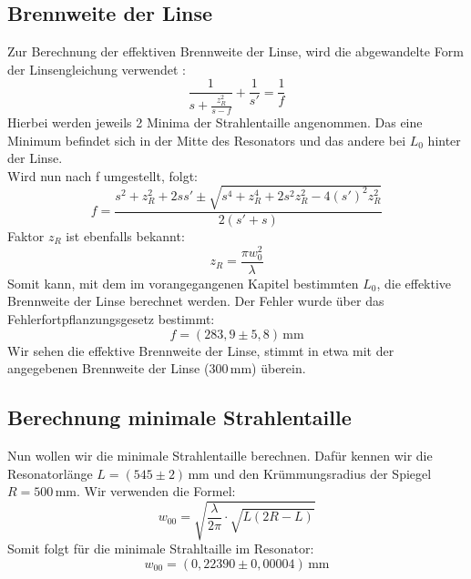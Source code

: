 \subsection{Brennweite der Linse}
Zur Berechnung der effektiven Brennweite der Linse, wird die abgewandelte Form der Linsengleichung verwendet \citep[vgl.][]{Anleitung}:
\begin{equation}
    \frac{1}{s+\frac{z_R^2}{s-f}}+\frac{1}{s'}=\frac{1}{f}
\end{equation}
Hierbei werden jeweils 2 Minima der Strahlentaille angenommen. Das eine Minimum befindet sich in der Mitte des Resonators und das andere bei $L_0$ hinter der Linse.\\
Wird nun nach f umgestellt, folgt:
\begin{equation}
    f=\frac{s^2+z_R^2+2ss'\pm\sqrt{s^4+z_R^4+2s^2z_R^2-4(s')^2z_R^2}}{2(s'+s)}
\end{equation}
Faktor $z_R$ ist ebenfalls bekannt:
\begin{equation}
    z_R=\frac{\pi w_0^2}{\lambda}
\end{equation}
Somit kann, mit dem im vorangegangenen Kapitel bestimmten $L_0$, die effektive Brennweite der Linse berechnet werden.
Der Fehler wurde über das Fehlerfortpflanzungsgesetz bestimmt:
\begin{equation}
    f=\left(283,9\pm5,8\right)\,\text{mm}
\end{equation}
Wir sehen die effektive Brennweite der Linse, stimmt in etwa mit der angegebenen Brennweite der Linse ($300\,\text{mm}$) überein.
\subsection{Berechnung minimale Strahlentaille}
Nun wollen wir die minimale Strahlentaille berechnen.
Dafür kennen wir die Resonatorlänge $L=\left(545\pm2\right)\,\text{mm}$ und den Krümmungsradius der Spiegel $R=500\,\text{mm}$.
Wir verwenden die Formel:
\begin{equation}
    w_{00}=\sqrt{\frac{\lambda}{2\pi}\cdot\sqrt{L(2R-L)}}
\end{equation}
Somit folgt für die minimale Strahltaille im Resonator:
\begin{equation}
    w_{00}=\left(0,22390\pm0,00004\right)\,\text{mm}
\end{equation}

